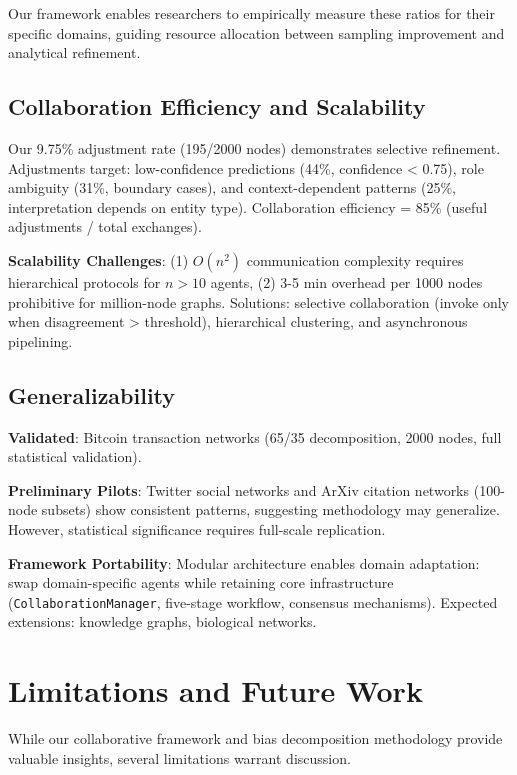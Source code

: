 \documentclass[conference]{IEEEtran}
\begin{document}
Our framework enables researchers to empirically measure these ratios for their specific domains, guiding resource allocation between sampling improvement and analytical refinement.

\subsection{Collaboration Efficiency and Scalability}

Our 9.75\% adjustment rate (195/2000 nodes) demonstrates selective refinement. Adjustments target: low-confidence predictions (44\%, confidence < 0.75), role ambiguity (31\%, boundary cases), and context-dependent patterns (25\%, interpretation depends on entity type). Collaboration efficiency = 85\% (useful adjustments / total exchanges).

\textbf{Scalability Challenges}: (1) $O(n^2)$ communication complexity requires hierarchical protocols for $n > 10$ agents, (2) 3-5 min overhead per 1000 nodes prohibitive for million-node graphs. Solutions: selective collaboration (invoke only when disagreement > threshold), hierarchical clustering, and asynchronous pipelining.

\subsection{Generalizability}

\textbf{Validated}: Bitcoin transaction networks (65/35 decomposition, 2000 nodes, full statistical validation). 

\textbf{Preliminary Pilots}: Twitter social networks and ArXiv citation networks (100-node subsets) show consistent patterns, suggesting methodology may generalize. However, statistical significance requires full-scale replication.

\textbf{Framework Portability}: Modular architecture enables domain adaptation: swap domain-specific agents while retaining core infrastructure (\texttt{CollaborationManager}, five-stage workflow, consensus mechanisms). Expected extensions: knowledge graphs, biological networks.

\section{Limitations and Future Work}\label{sec:limitations}

While our collaborative framework and bias decomposition methodology provide valuable insights, several limitations warrant discussion.
\end{document}
